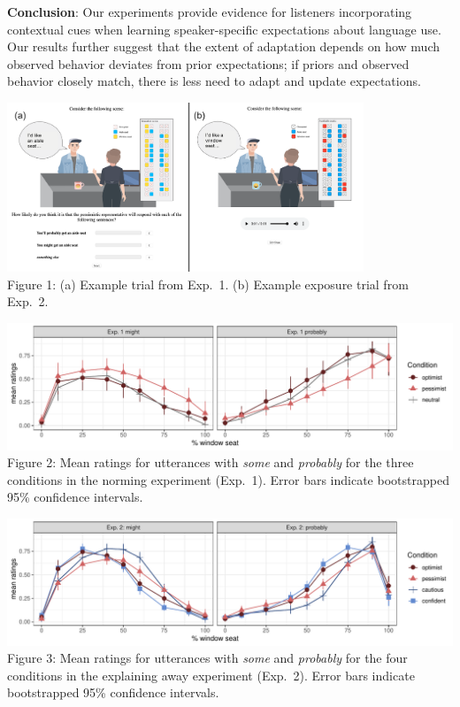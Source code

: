 \documentclass[11pt,a4paper]{article}
\begin{document}
\noindent \textbf{Conclusion}: Our experiments provide evidence for listeners incorporating contextual cues when learning speaker-specific expectations about language use. Our results further suggest that the extent of adaptation depends on how much observed behavior deviates from prior expectations; if priors and observed behavior closely match, there is less need to adapt and update expectations.

\hspace{0.06\textwidth}\includegraphics[width=0.8\textwidth]{./plots/example-trial.png}\\
{\small Figure 1: (a) Example trial from Exp.~1. (b) Example exposure trial from Exp.~2.}

\vspace{0.4em}
\includegraphics[width=\textwidth]{./plots/norming.pdf}\\
{\small Figure 2: Mean ratings for utterances with \textit{some} and \textit{probably} for the three conditions in the norming experiment (Exp.~1). Error bars indicate bootstrapped 95\% confidence intervals.}

\vspace{0.4em}
\includegraphics[width=\textwidth]{./plots/exp.pdf}\\
{\small Figure 3: Mean ratings for utterances with \textit{some} and \textit{probably} for the four conditions in the explaining away experiment (Exp.~2). Error bars indicate bootstrapped 95\% confidence intervals. }
\end{document}
